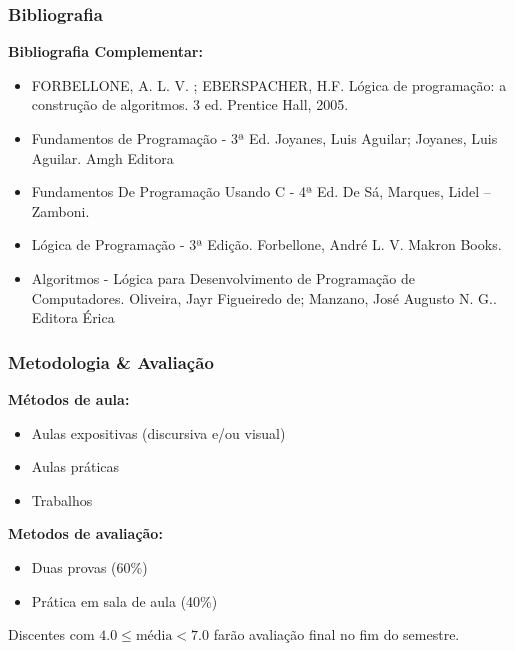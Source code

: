 \begin{frame}
	\frametitle{Bibliografia}
	
	\textbf{Bibliografia Complementar:}
	\begin{itemize}
		\item FORBELLONE, A. L. V. ; EBERSPACHER, H.F. Lógica de programação: a construção de algoritmos. 3
		ed. Prentice Hall, 2005.
		\item Fundamentos de Programação - 3ª Ed. Joyanes, Luis Aguilar; Joyanes, Luis Aguilar. Amgh Editora
		\item Fundamentos De Programação Usando C - 4ª Ed. De Sá, Marques, Lidel – Zamboni.
		\item Lógica de Programação - 3ª Edição. Forbellone, André L. V. Makron Books.
		\item Algoritmos - Lógica para Desenvolvimento de Programação de Computadores. Oliveira, Jayr Figueiredo de; Manzano, José Augusto N. G.. Editora Érica
	\end{itemize}
\end{frame}




\begin{frame}
	\frametitle{Metodologia \& Avaliação}
	
	\textbf{Métodos de aula:}
	\begin{itemize}
		\item Aulas expositivas (discursiva e/ou visual)
		\item Aulas práticas
		\item Trabalhos
	\end{itemize}
	
	\vspace{10pt}

	\textbf{Metodos de avaliação:}
	\begin{itemize}
		\item Duas provas (60\%)
		\item Prática em sala de aula (40\%)
	\end{itemize}

	\vspace{10pt}
	Discentes com \(4.0 \le \mbox{média} < 7.0\) farão avaliação final no fim do semestre.
\end{frame}